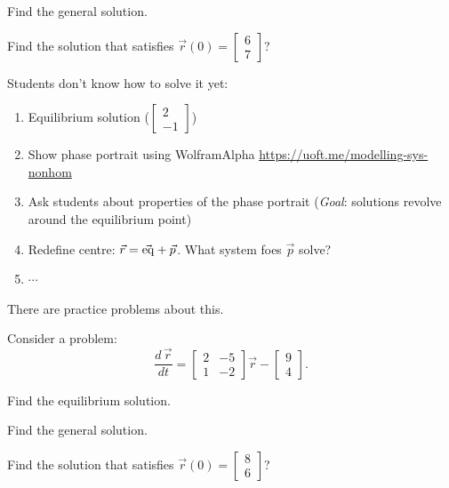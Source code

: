 \begin{parts}
	\item Find the general solution.
	\item Find the solution that satisfies $\vec{r}(0) = \begin{bmatrix} 6 \\ 7\end{bmatrix}$?
\end{parts}



\bookonlynewpage



\begin{annotation}
	\begin{goals}
		
		Students don't know how to solve it yet:
		\begin{enumerate}
			\item Equilibrium solution ($\begin{bmatrix}2\\-1\end{bmatrix}$)
			\item Show phase portrait using WolframAlpha \url{https://uoft.me/modelling-sys-nonhom}
			\item Ask students about properties of the phase portrait (\emph{Goal}: solutions revolve around the equilibrium point)
			\item Redefine centre: $\vec{r} = \vec{\rm eq} + \vec{p}$. What system foes $\vec{p}$ solve?
			\item $\cdots$
		\end{enumerate}
		
		There are practice problems about this.
	\end{goals}
\end{annotation}
\question
Consider a problem:
$$
\frac{d \,\vec{r}}{dt} = \begin{bmatrix} 2 & -5 \\ 1 & -2\end{bmatrix} \vec{r} - \begin{bmatrix} 9 \\ 4 \end{bmatrix}.
$$
\begin{parts}
	\item Find the equilibrium solution.
	\item Find the general solution.
	\item Find the solution that satisfies $\vec{r}(0) = \begin{bmatrix} 8 \\ 6 \end{bmatrix}$?
\end{parts}


